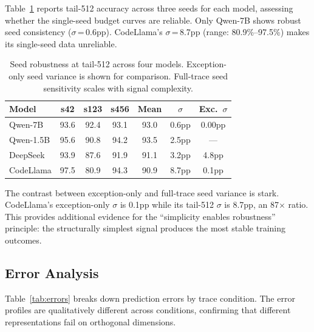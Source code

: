 \documentclass[11pt]{article}
\begin{document}
Table~\ref{tab:seed-budget} reports tail-512 accuracy across three seeds for each model, assessing whether the single-seed budget curves are reliable. Only Qwen-7B shows robust seed consistency ($\sigma$\,=\,0.6pp). CodeLlama's $\sigma$\,=\,8.7pp (range: 80.9\%--97.5\%) makes its single-seed data unreliable.

\begin{table}[t]
\centering
\caption{Seed robustness at tail-512 across four models. Exception-only seed variance is shown for comparison. Full-trace seed sensitivity scales with signal complexity.}
\label{tab:seed-budget}
\small
\begin{tabular}{lcccccc}
\toprule
\textbf{Model} & \textbf{s42} & \textbf{s123} & \textbf{s456} & \textbf{Mean} & \textbf{$\sigma$} & \textbf{Exc.\ $\sigma$} \\
\midrule
Qwen-7B & 93.6 & 92.4 & 93.1 & 93.0 & 0.6pp & 0.00pp \\
Qwen-1.5B & 95.6 & 90.8 & 94.2 & 93.5 & 2.5pp & --- \\
DeepSeek & 93.9 & 87.6 & 91.9 & 91.1 & 3.2pp & 4.8pp \\
CodeLlama & 97.5 & 80.9 & 94.3 & 90.9 & 8.7pp & 0.1pp \\
\bottomrule
\end{tabular}
\end{table}

The contrast between exception-only and full-trace seed variance is stark. CodeLlama's exception-only $\sigma$ is 0.1pp while its tail-512 $\sigma$ is 8.7pp, an 87$\times$ ratio. This provides additional evidence for the ``simplicity enables robustness'' principle: the structurally simplest signal produces the most stable training outcomes.

\subsection{Error Analysis}
\label{sec:exp-errors}

Table~\ref{tab:errors} breaks down prediction errors by trace condition. The error profiles are qualitatively different across conditions, confirming that different representations fail on orthogonal dimensions.
\end{document}
